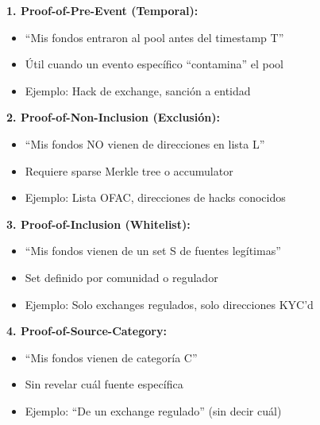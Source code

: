 \documentclass[11pt,a4paper,twoside]{book}
\theoremstyle{definition}
\theoremstyle{remark}
\begin{document}
\begin{mathnote}
\textbf{1. Proof-of-Pre-Event (Temporal):}
\begin{itemize}
    \item ``Mis fondos entraron al pool antes del timestamp T''
    \item Útil cuando un evento específico ``contamina'' el pool
    \item Ejemplo: Hack de exchange, sanción a entidad
\end{itemize}

\textbf{2. Proof-of-Non-Inclusion (Exclusión):}
\begin{itemize}
    \item ``Mis fondos NO vienen de direcciones en lista L''
    \item Requiere sparse Merkle tree o accumulator
    \item Ejemplo: Lista OFAC, direcciones de hacks conocidos
\end{itemize}

\textbf{3. Proof-of-Inclusion (Whitelist):}
\begin{itemize}
    \item ``Mis fondos vienen de un set S de fuentes legítimas''
    \item Set definido por comunidad o regulador
    \item Ejemplo: Solo exchanges regulados, solo direcciones KYC'd
\end{itemize}

\textbf{4. Proof-of-Source-Category:}
\begin{itemize}
    \item ``Mis fondos vienen de categoría C''
    \item Sin revelar cuál fuente específica
    \item Ejemplo: ``De un exchange regulado'' (sin decir cuál)
\end{itemize}
\end{mathnote}
\end{document}
